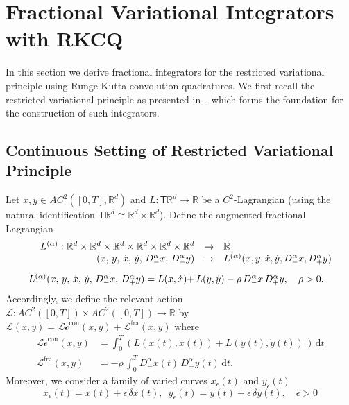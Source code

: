 \documentclass[a4paper,10pt,reqno]{amsart}
\theoremstyle{definition}
\newcommand{\R}{\mathbb{R}}      %
\newcommand{\Flder}{\rightarrow}
\newcommand{\dd}{\mathrm{d}}
\newcommand{\Lc}{\mathcal{Lc}^{\text{con}}}
\newcommand{\Lf}{\mathcal{L}^{\text{fra}}}
\begin{document}
\section{Fractional Variational Integrators with RKCQ}\label{sec:FVI}
In this section we derive fractional integrators for the restricted variational principle using  Runge-Kutta convolution quadratures. We first recall the restricted variational principle as presented in~\cite{JiOb1,JiOb2}, which forms the foundation for the construction of such integrators.

\subsection{Continuous Setting of Restricted Variational Principle}\label{sec:restrectedCOV}
Let  $x,y\in AC^2([0,T],\mathbb R^d)$ and  $L:\mathsf{T}\R^d\Flder \R$ be a $C^2$-Lagrangian (using the natural identification $\mathsf{T}\R^d\cong\R^d\times\R^d$). Define the augmented fractional Lagrangian
\begin{equation}\label{GenerLag}
\begin{array}{rcl} L^{(\alpha)}:\R^d\times\R^d\times\R^d\times\R^d\times\R^d\times\R^d &  \Flder  & \R \\
 (x,\,y,\,\dot x,\,\dot y,\, D^{\alpha}_{-}x,\, D^{\alpha}_{+}y)    & \mapsto&L^{(\alpha)}(x,y,\dot x,\dot y, D^{\alpha}_{-}x,D^{\alpha}_{+}y)\\ [2ex]
  L^{(\alpha)}(x,\,y,\,\dot x,\,\dot y,\, D^{\alpha}_{-}x,\, D^{\alpha}_{+}y)=L(x,\dot x)+&&\hspace{-1cm}L(y,\dot y)-\rho\,D^{\alpha}_{-}x\,D^{\alpha}_{+}y,\quad \rho >0.
\end{array}
\end{equation}
Accordingly, we define  the relevant action $\mathcal{L}: AC^2([0,T])\times AC^2([0,T])\to \R$ by  
$\mathcal{L}(x,y)=\Lc(x,y)+\Lf(x,y)$ where
\begin{equation}\label{FracAction}
\begin{split}
\Lc(x,y)&=\int_0^T(L(x(t),\dot x(t))+L(y(t),\dot y(t))\,)\, \dd t\\
\Lf(x,y)&=-\rho\,\int_0^T D^{\alpha}_{-}x(t)\,D^{\alpha}_{+}y(t)\,\dd t.
\end{split}
\end{equation}
Moreover,  we consider a family of varied curves $x_\epsilon(t)$ and $y_\epsilon(t)$
\begin{equation}\label{VariedCurves}
x_{\epsilon}(t)=x(t)+\epsilon\, \delta x(t),\,\,\,y_{\epsilon}(t)=y(t)+\epsilon\, \delta y(t),\quad \epsilon>0
\end{equation}
\end{document}
